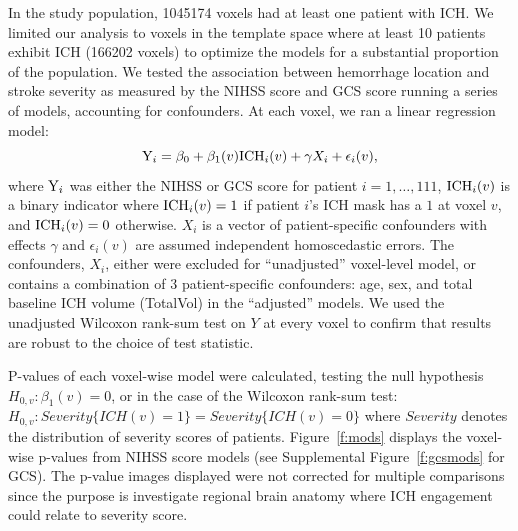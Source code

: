 \documentclass[10pt]{article}\usepackage[]{graphicx}\usepackage[]{color}
\begin{document}
In the study population, 1045174 voxels had at least one patient with ICH.  We limited our analysis to voxels in the template space where at least 10 patients exhibit ICH (166202 voxels) to optimize the models for a substantial proportion of the population.
We tested the association between hemorrhage location and stroke severity as measured by the NIHSS score and GCS score running a series of models, accounting for confounders.  At each voxel, we ran a linear regression model:
\begin{equation}\label{eq:nihss_regression}
{\rm Y}_i=\beta_0+\beta_1(v) {\rm ICH}_i(v)+ \gamma X_i + \epsilon_{i}(v), 
\end{equation}
where ${\rm Y}_i$ was either the NIHSS or GCS score for patient $i=1,\ldots,111$, ${\rm ICH}_i(v)$ is a binary indicator where ${\rm ICH}_i(v) = 1$ if patient $i$'s ICH mask has a $1$ at voxel $v$, and ${\rm ICH}_i(v) = 0$ otherwise. $X_i$ is a vector of patient-specific confounders with effects $\gamma$ and $\epsilon_{i}(v)$ are assumed independent homoscedastic errors.  The confounders, $X_i$, either were excluded for ``unadjusted'' voxel-level model, or contains a combination of $3$ patient-specific confounders: age, sex, and total baseline ICH volume (TotalVol) in the ``adjusted'' models.  We used the unadjusted Wilcoxon rank-sum test on $Y$ at every voxel to confirm that results are robust to the choice of test statistic.


P-values of each voxel-wise model were calculated, testing the null hypothesis $H_{0,v}:\beta_1(v)=0$, or in the case of the Wilcoxon rank-sum test: $H_{0,v}: Severity\{ICH(v) = 1\} = Severity\{ICH(v) = 0\}$ where $Severity$ denotes the distribution of severity scores of patients.  Figure~\ref{f:mods} displays the voxel-wise p-values from NIHSS score models (see Supplemental Figure~\ref{f:gcsmods} for GCS).  The p-value images displayed were not corrected for multiple comparisons since the purpose is investigate regional brain anatomy where ICH engagement could relate to severity score.

\end{document}
